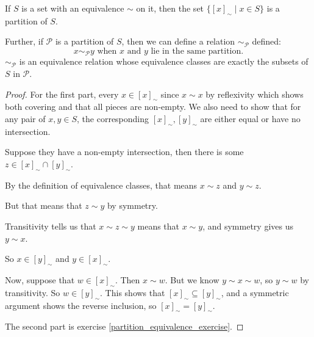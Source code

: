 \begin{theorem}
    If $S$ is a set with an equivalence $\sim$ on it, then the set $\{ [x]_{\sim} \mid x \in S \}$ is a partition of $S$. 
    
    \medbreak\noindent
    Further, if $\mathcal{P}$ is a partition of $S$, then we can define a relation $\sim_{\mathcal{P}}$ defined:
    \begin{equation*}    
        \text{$x \sim_{\mathcal{P}} y$ when $x$ and $y$ lie in the same partition.}
    \end{equation*}
    $\sim_{\mathcal{P}}$ is an equivalence relation whose equivalence classes are exactly the subsets of $S$ in $\mathcal{P}$.
    \label{equivalences_partition}
\end{theorem}
\begin{proof}
    For the first part, every $x \in [x]_{\sim}$ since $x \sim x$ by reflexivity which shows both covering and that all pieces are non-empty. We also need to show that for any pair of $x,y\in S$, the corresponding $[x]_{\sim}, [y]_{\sim}$ are either equal or have no intersection.
    
    \smallskip\noindent
    Suppose they have a non-empty intersection, then there is some $z \in [x]_{\sim} \cap [y]_{\sim}$.
    
    \noindent
    By the definition of equivalence classes, that means $x \sim z$ and $y \sim z$. 
    
    \noindent
    But that means that $z \sim y$ by symmetry. 
    
    \noindent
    Transitivity tells us that $x \sim z \sim y$ means that $x \sim y$, and symmetry gives us $y \sim x$.
    
    \noindent
    So $x \in [y]_{\sim}$ and $y \in [x]_{\sim}$.

    \smallskip\noindent
    Now, suppose that $w \in [x]_{\sim}$. Then $x \sim w$. But we know $y \sim x \sim w$, so $y \sim w$ by transitivity. So $w \in [y]_{\sim}$.
    This shows that $[x]_{\sim} \subseteq [y]_{\sim}$, and a symmetric argument shows the reverse inclusion, so $[x]_{\sim} = [y]_{\sim}$.

    \medskip\noindent
    The second part is exercise \ref{partition_equivalence_exercise}.
\end{proof}

